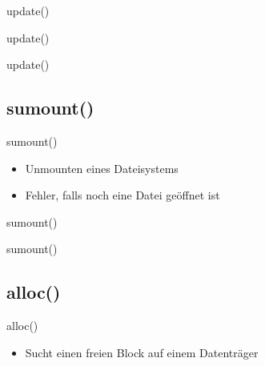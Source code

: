 \documentclass{beamer}
\begin{document}
\begin{frame}{update()}
\end{frame}

\begin{frame}{update()}
\end{frame}

\begin{frame}{update()}
\end{frame}




\subsection{sumount()}

\begin{frame}{sumount()}
    \begin{itemize}
        \item Unmounten eines Dateisystems
        \medskip
        \item Fehler, falls noch eine Datei geöffnet ist
    \end{itemize}
\end{frame}

\begin{frame}{sumount()}
\end{frame}

\begin{frame}{sumount()}
\end{frame}




\subsection{alloc()}

\begin{frame}{alloc()}
    \begin{itemize}
        \item Sucht einen freien Block auf einem Datenträger
    \end{itemize}
\end{frame}
\end{document}
